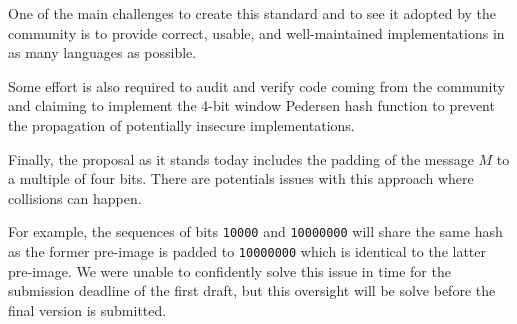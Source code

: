{\color{purple} One of the main challenges to create this standard and to see it adopted by the community is
to provide correct, usable, and well-maintained implementations in as many languages as possible.

Some effort is also required to audit and verify code coming from the community
and claiming to implement the 4-bit window Pedersen hash function
to prevent the propagation of potentially insecure implementations.

Finally, the proposal as it stands today includes the padding of the message $M$ to a multiple of four bits.
There are potentials issues with this approach where collisions can happen.

For example, the sequences of bits \texttt{10000} and \texttt{10000000} will share the same hash
as the former pre-image is padded to \texttt{10000000} which is identical to the latter pre-image.
We were unable to confidently solve this issue in time for the submission deadline of the first draft,
but this oversight will be solve before the final version is submitted.}


